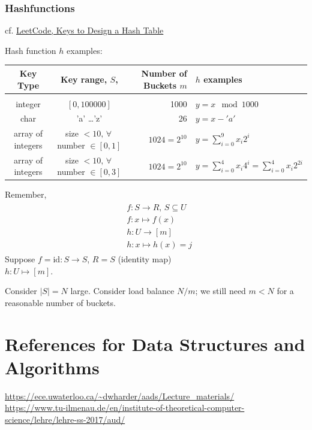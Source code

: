 \documentclass[10pt]{amsart}
\begin{document}
\begin{multicols*}{2}
\subsubsection{Hashfunctions}

cf. \href{https://leetcode.com/explore/learn/card/hash-table/182/practical-applications/1110/}{LeetCode, Keys to Design a Hash Table}

Hash function $h$ examples:

\begin{center}
	\begin{tabular}{ c  c  r  l }
		Key Type & Key range, $S$, & Number of Buckets $m$ & $h$ examples \\ \hline \\
		integer & $[0, 100000]$ & 1000 & $y = x \mod{1000} $ \\
		char & 'a' \dots 'z' & 26 & $ y = x - 'a'$ \\ 
		array of integers & size $< 10, \, \forall \,$ number $\in [0,1]$ & $1024=2^{10}$ & $ y = \sum_{i=0}^9 x_i 2^i$ \\
		array of integers & size $< 10, \, \forall \, $ number $\in [0,3 ]$ & $1024 = 2^{10}$ & $y = \sum_{i=0}^4 x_i 4^i = \sum_{i=0}^4 x_i 2^{2i}$ 
	\end{tabular}
\end{center}

Remember,
\begin{equation}
\boxed{
\begin{gathered}
	\begin{aligned}
	& f:S \to R, \, S \subseteq U \\ 
	& f:x \mapsto f(x) \\
	& h:U\to [m] \\ 
	& h:x \mapsto h(x) = j
	\end{aligned}
\end{gathered} }
\end{equation}
Suppose $f= \text{id}: S \to S$, $R=S$ (identity map) \\
$h:U \mapsto [m] $.

Consider $|S| = N$ large. Consider load balance $N/m $; we still need $m < N$ for a reasonable number of buckets.

\section{References for Data Structures and Algorithms}

\url{https://ece.uwaterloo.ca/~dwharder/aads/Lecture_materials/} \\
\url{https://www.tu-ilmenau.de/en/institute-of-theoretical-computer-science/lehre/lehre-ss-2017/aud/}


\end{multicols*}
\end{document}
